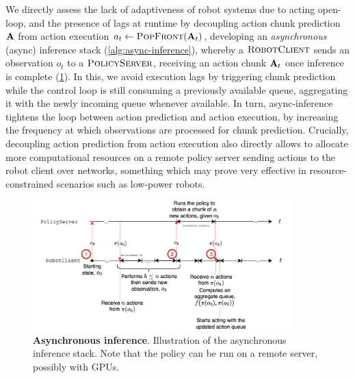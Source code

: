 We directly assess the lack of adaptiveness of robot systems due to acting open-loop, and the presence of lags at runtime by decoupling action chunk prediction \( \mathbf{A} \) from action execution \( a_t \gets \textsc{PopFront}(\mathbf{A}_t) \), developing an \emph{asynchronous} (async) inference stack (\ref{alg:async-inference}), whereby a \( \textsc{RobotClient} \) sends an observation \( o_t \) to a \( \textsc{PolicyServer} \), receiving an action chunk \( \mathbf{A}_t \) once inference is complete (\ref{fig:ch4-async-inference}).
In this, we avoid execution lags by triggering chunk prediction while the control loop is still consuming a previously available queue, aggregating it with the newly incoming queue whenever available.
In turn, async-inference tightens the loop between action prediction and action execution, by increasing the frequency at which observations are processed for chunk prediction.
Crucially, decoupling action prediction from action execution also directly allows to allocate more computational resources on a remote policy server sending actions to the robot client over networks, something which may prove very effective in resource-constrained scenarios such as low-power robots.

\begin{figure}
    \centering
    \begin{minipage}[t]{\textwidth}
        \centering
        \includegraphics[width=0.9\textwidth]{figures/ch4/ch4-async-inference.png}
        \caption{\textbf{Asynchronous inference}. Illustration of the asynchronous inference stack. Note that the policy can be run on a remote server, possibly with GPUs.}
        \label{fig:ch4-async-inference}
    \end{minipage}
    \vspace{-0.6cm}
\end{figure}

